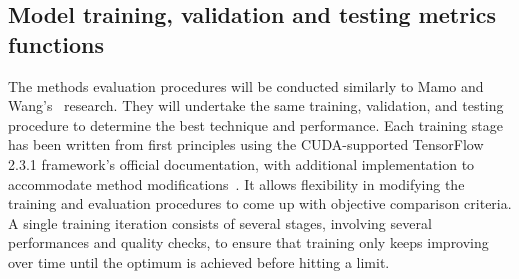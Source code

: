 \subsection{Model training, validation and testing metrics functions} \label{subsec:t_model}
%
The methods evaluation procedures will be conducted similarly to Mamo and Wang's~\cite{mamo_long_2020} research.
They will undertake the same training, validation, and testing procedure to determine the best technique and performance.
Each training stage has been written from first principles using the CUDA-supported TensorFlow 2.3.1 framework's official documentation, with additional implementation to accommodate method modifications~\cite{chollet_writing_2020}.
It allows flexibility in modifying the training and evaluation procedures to come up with objective comparison criteria.
A single training iteration consists of several stages, involving several performances and quality checks, to ensure that training only keeps improving over time until the optimum is achieved before hitting a limit.

